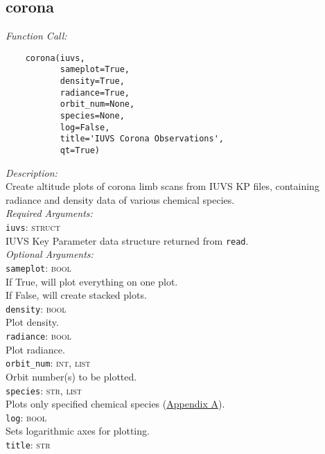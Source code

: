 \documentclass{article}
\begin{document}
\subsection{corona}
\label{subsec:corona}
\vspace{-5mm}
\textit{Function Call:}\\
\vspace{-10mm}
\begin{verbatim}
    corona(iuvs,
           sameplot=True,
           density=True,
           radiance=True,
           orbit_num=None,
           species=None,
           log=False,
           title='IUVS Corona Observations',
           qt=True)
\end{verbatim}
\noindent
\textit{Description:}\\
\indent Create altitude plots of corona limb scans from IUVS KP files, containing\\
\indent radiance and density data of various chemical species.\\
\textit{Required Arguments:}\\
\indent \texttt{iuvs}: \textsc{struct}\\
\indent \indent IUVS Key Parameter data structure returned from \texttt{read}.\\
\textit{Optional Arguments:}\\
\indent \texttt{sameplot}: \textsc{bool}\\
\indent \indent If True, will plot everything on one plot.\\
\indent \indent If False, will create stacked plots.\\
\indent \texttt{density}: \textsc{bool}\\
\indent \indent Plot density.\\
\indent \texttt{radiance}: \textsc{bool}\\
\indent \indent Plot radiance.\\
\indent \texttt{orbit\_num}: \textsc{int, list}\\
\indent \indent Orbit number(s) to be plotted.\\
\indent \texttt{species}: \textsc{str, list}\\
\indent \indent Plots only specified chemical species (\hyperref[sec:chemicalspecies]{Appendix A}).\\
\indent \texttt{log}: \textsc{bool}\\
\indent \indent Sets logarithmic axes for plotting.\\
\indent \texttt{title}: \textsc{str}\\
\end{document}
